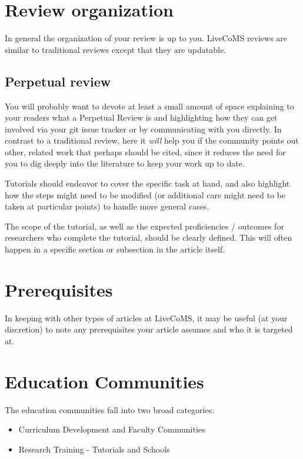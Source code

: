 \documentclass[9pt,review]{livecoms}
\begin{document}
\section{Review organization}

In general the organization of your review is up to you.
LiveCoMS reviews are similar to traditional reviews except that they are updatable.

\subsection{Perpetual review}

You will probably want to devote at least a small amount of space explaining to your readers what a Perpetual Review is and highlighting how they can get involved via your git issue tracker or by communicating with you directly.
In contrast to a traditional review, here it \emph{will} help you if the community points out other, related work that perhaps should be cited, since it reduces the need for you to dig deeply into the literature to keep your work up to date.

Tutorials should endeavor to cover the specific task at hand, and also highlight how the steps might need to be modified (or additional care might need to be taken at particular points) to handle more general cases.

The scope of the tutorial, as well as the expected proficiencies / outcomes for researchers who complete the tutorial, should be clearly defined.
This will often happen in a specific section or subsection in the article itself.

\section{Prerequisites}

In keeping with other types of articles at LiveCoMS, it may be useful (at your discretion) to note any prerequisites your article assumes and who it is targeted at.

\section{Education Communities}

The education communities fall into two broad categories:
\begin{itemize}
    \item Curriculum Development and Faculty Communities
    \item Research Training - Tutorials and Schools
\end{itemize}
\end{document}
